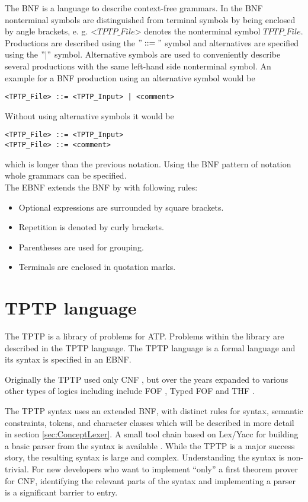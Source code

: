 The \acf{BNF} is a language to describe context-free grammars.
In the \acf{BNF} nonterminal symbols are distinguished from terminal symbols by being enclosed by  angle brackets, e. g. <$TPTP\_File$> denotes the nonterminal symbol $TPTP\_File$.
Productions are described using the $"::="$ symbol and alternatives are specified using the $"|"$ symbol. \cite{BNF.1964} 
Alternative symbols are used to conveniently describe several productions with the same left-hand side nonterminal symbol.
An example for a \ac{BNF} production using an alternative symbol would be 
\begin{verbatim}
<TPTP_File> ::= <TPTP_Input> | <comment>
\end{verbatim}
Without using alternative symbols it would be
\begin{verbatim}
<TPTP_File> ::= <TPTP_Input>
<TPTP_File> ::= <comment>
\end{verbatim}
which is longer than the previous notation. 
Using the \ac{BNF} pattern of notation whole grammars can be specified.\\
The \ac{EBNF} extends the \ac{BNF} by with following rules:

\begin{itemize}%
	\item Optional expressions are surrounded by square brackets.
	\item Repetition is denoted by curly brackets.
	\item Parentheses are used for grouping.
	\item Terminals are enclosed in quotation marks.
\end{itemize}
\label{itemize:BackgroundBNF}
\cite{EBNF.1977}

\section{TPTP language}\label{sec:BackgroundTPTP}

The \acf{TPTP} is a library of problems for \ac{ATP}.
Problems within the library are described in the \ac{TPTP} language.
The  \ac{TPTP} language is a formal language and its syntax is specified in an \ac{EBNF}. \cite{Sut17}

Originally the \ac{TPTP} used only \ac{CNF} \cite{Sut09}, but over the
years expanded to various other types of logics including
include \ac{FOF} \cite{Sut09}, Typed \ac{FOF} \cite{SS+12, BP:CADE-2013} and \ac{THF} \cite{SB10, KSR:PAAR-2016}.

The TPTP syntax uses an extended \ac{BNF}, with distinct rules for syntax, semantic constraints, tokens, and character classes which will be described in more detail in section \ref{sec:ConceptLexer}.
A small tool chain based on Lex/Yacc for building a basic parser from the syntax is available \cite{VS06}.
While the TPTP is a major success story, the resulting syntax is large and complex.
Understanding the syntax is non-trivial.
For new developers who want to implement ``only'' a first theorem prover for \ac{CNF}, identifying the relevant parts of the syntax and implementing a parser is a significant barrier to entry.


